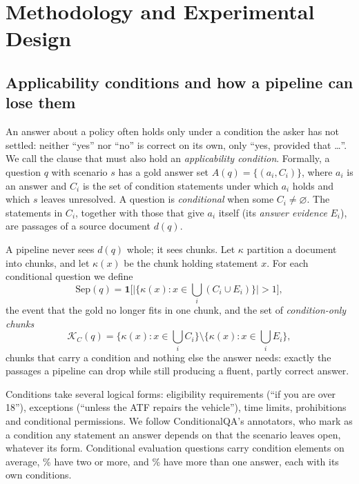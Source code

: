 \section{{Methodology and Experimental Design}}
\label{sec:method}

\subsection{Applicability conditions and how a pipeline can lose them}

An answer about a policy often holds only under a condition the asker has not settled: neither ``yes'' nor ``no'' is correct on its own, only ``yes, provided that \dots''. We call the clause that must also hold an \emph{applicability condition}. Formally, a question $q$ with scenario $s$ has a gold answer set $A(q)=\{(a_i, C_i)\}$, where $a_i$ is an answer and $C_i$ is the set of condition statements under which $a_i$ holds and which $s$ leaves unresolved. A question is \emph{conditional} when some $C_i \neq \varnothing$. The statements in $C_i$, together with those that give $a_i$ itself (its \emph{answer evidence} $E_i$), are passages of a source document $d(q)$.

A pipeline never sees $d(q)$ whole; it sees chunks. Let $\kappa$ partition a document into chunks, and let $\kappa(x)$ be the chunk holding statement $x$. For each conditional question we define
\begin{equation}
\mathrm{Sep}(q) = \mathbf{1}\Big[\big|\{\kappa(x) : x \in \textstyle\bigcup_i (C_i \cup E_i)\}\big| > 1\Big],
\end{equation}
the event that the gold no longer fits in one chunk, and the set of \emph{condition-only chunks}
\begin{equation}
\mathcal{K}_C(q) = \{\kappa(x) : x \in \textstyle\bigcup_i C_i\} \setminus \{\kappa(x) : x \in \textstyle\bigcup_i E_i\},
\end{equation}
chunks that carry a condition and nothing else the answer needs: exactly the passages a pipeline can drop while still producing a fluent, partly correct answer.

Conditions take several logical forms: eligibility requirements (``if you are over 18''), exceptions (``unless the ATF repairs the vehicle''), time limits, prohibitions and conditional permissions. We follow ConditionalQA's annotators, who mark as a condition any statement an answer depends on that the scenario leaves open, whatever its form. Conditional evaluation questions carry \annMeanCond{} condition elements on average, \annTwoPlus\% have two or more, and \annMultiAnswer\% have more than one answer, each with its own conditions.

